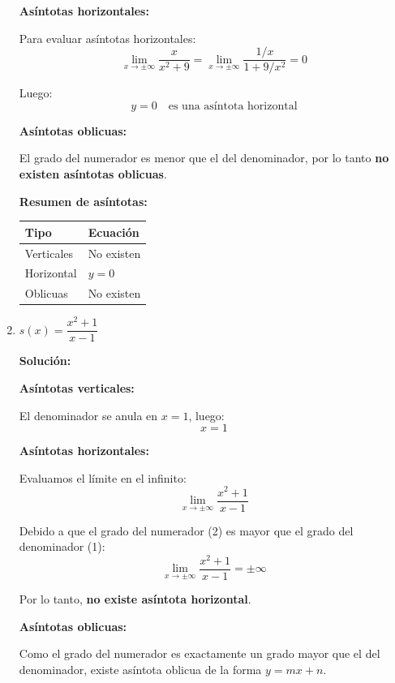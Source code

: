\documentclass[12pt]{article}
\newcommand{\solucion}{%
    \vspace{0.8em}%
    \textbf{Solución:}%
}
\begin{document}
\begin{enumerate}[label=\alph*)]
    \textbf{Asíntotas horizontales:}

    Para evaluar asíntotas horizontales:
    \[
    \lim_{x \to \pm\infty} \frac{x}{x^2 + 9} = \lim_{x \to \pm\infty} \frac{1/x}{1 + 9/x^2} = 0
    \]

    Luego:
    \[
    \boxed{y = 0} \quad \text{es una asíntota horizontal}
    \]

    \textbf{Asíntotas oblicuas:}

    El grado del numerador es menor que el del denominador, por lo tanto \textbf{no existen asíntotas oblicuas}.

    \vspace{0.5em}
    \textbf{Resumen de asíntotas:}

    \begin{center}
    \begin{tabular}{ll}
        \toprule
        Tipo & Ecuación \\
        \midrule
        Verticales & No existen \\
        Horizontal & $y = 0$ \\
        Oblicuas & No existen \\
        \bottomrule
    \end{tabular}
    \end{center}

    \newpage
    \item $s(x) = \dfrac{x^2 + 1}{x - 1}$

    \solucion

    \textbf{Asíntotas verticales:}

    El denominador se anula en $x = 1$, luego:
    \[
    \boxed{x = 1}
    \]

    \textbf{Asíntotas horizontales:}

    Evaluamos el límite en el infinito:
    \[
    \lim_{x \to \pm\infty} \frac{x^2 + 1}{x - 1}
    \]

    Debido a que el grado del numerador (2) es mayor que el grado del denominador (1):
    \[
    \lim_{x \to \pm\infty} \frac{x^2 + 1}{x - 1} = \pm\infty
    \]

    Por lo tanto, \textbf{no existe asíntota horizontal}.

    \textbf{Asíntotas oblicuas:}

    Como el grado del numerador es exactamente un grado mayor que el del denominador, existe asíntota oblicua de la forma $y = mx + n$.


\end{enumerate}
\end{document}
